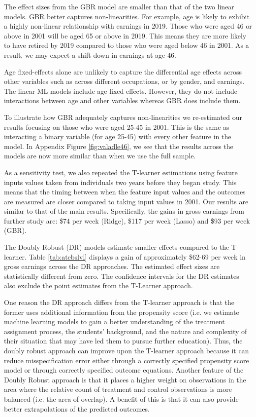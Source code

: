 \documentclass[12pt, a4paper]{article}
\begin{document}
The effect sizes from the GBR model are smaller than that of the two linear models. GBR better captures non-linearities. For example, age is likely to exhibit a highly non-linear relationship with earnings in 2019. Those who were aged 46 or above in 2001 will be aged 65 or above in 2019. This means they are more likely to have retired by 2019 compared to those who were aged below 46 in 2001. As a result, we may expect a shift down in earnings at age 46. 

Age fixed-effects alone are unlikely to capture the differential age effects across other variables such as across different occupations, or by gender, and earnings. The linear ML models include age fixed effects. However, they do not include interactions between age and other variables whereas GBR does include them.

To illustrate how GBR adequately captures non-linearities we re-estimated our results focusing on those who were aged 25-45 in 2001. This is the same as interacting a binary variable (for age 25-45) with every other feature in the model. In Appendix Figure \ref{fig:valadle46}, we see that the results across the models are now more similar than when we use the full sample.

As a sensitivity test, we also repeated the T-learner estimations using feature inputs values taken from individuals two years before they began study. This means that the timing between when the feature input values and the outcomes are measured are closer compared to taking input values in 2001. Our results are similar to that of the main results. Specifically, the gains in gross earnings from further study are: \$74 per week (Ridge), \$117 per week (Lasso) and \$93 per week (GBR). 

The Doubly Robust (DR) models estimate smaller effects compared to the T-learner. Table \ref{tab:atebslvl} displays a gain of approximately \$62-69 per week in gross earnings across the DR approaches. The estimated effect sizes are statistically different from zero. The confidence intervals for the DR estimates also exclude the point estimates from the T-Learner approach.

One reason the DR approach differs from the T-learner approach is that the
former uses additional information from the propensity score (i.e. we estimate
machine learning models to gain a better understanding of the treatment
assignment process, the students’ background, and the nature and complexity of
their situation that may have led them to pursue further education). Thus, the
doubly robust approach can improve upon the T-learner approach because it can
reduce misspecification error either through a correctly specified propensity
score model or through correctly specified outcome equations. Another feature
of the Doubly Robust approach is that it places a higher weight on observations
in the area where the relative count of treatment and control observations is
more balanced (i.e. the area of overlap). A benefit of this is that it can also
provide better extrapolations of the predicted outcomes. 
\end{document}

